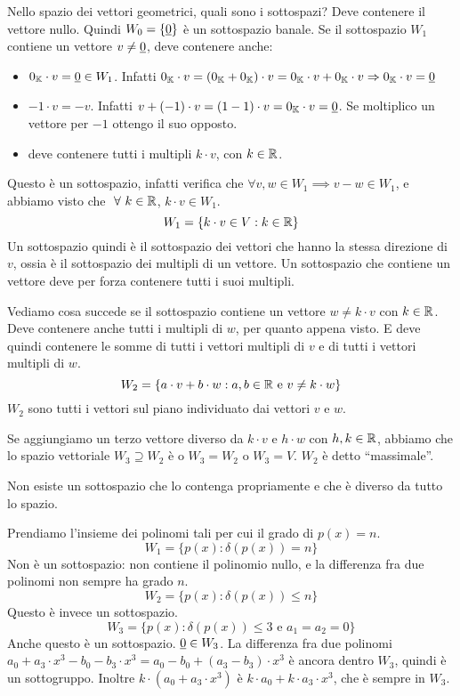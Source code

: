 Nello spazio dei vettori geometrici, quali sono i sottospazi? Deve contenere il vettore nullo. Quindi $W_0 = \{ \underline{0} \}$ \`e un sottospazio banale. Se il sottospazio $W_1$ contiene un vettore $v \neq \underline{0}$, deve contenere anche:
\begin{itemize}
    \item $0_{\mathbb{K}} \cdot v = \underline{0} \in W_1$. Infatti $0_{\mathbb{K}} \cdot v = (0_{\mathbb{K}} + 0_{\mathbb{K}}) \cdot v = 0_{\mathbb{K}} \cdot v + 0_{\mathbb{K}} \cdot v \Rightarrow 0_{\mathbb{K}} \cdot v = \underline{0}$
    \item $-1 \cdot v = -v$. Infatti $v + (-1) \cdot v = (1 - 1) \cdot v = 0_{\mathbb{K}} \cdot v = \underline{0}$. Se moltiplico un vettore per $-1$ ottengo il suo opposto.
    \item deve contenere tutti i multipli $k \cdot v$, con $k \in \mathbb{R}$.
\end{itemize}
Questo \`e un sottospazio, infatti verifica che $\forall v, w \in W_1 \implies v - w \in W_1$, e abbiamo visto che $\forall k \in \reals$, $k \cdot v \in W_1$.
\[
W_1 = \{ k \cdot v \in V : k \in \mathbb{R} \}
\]
Un sottospazio quindi \`e il sottospazio dei vettori che hanno la stessa direzione di $v$, ossia \`e il sottospazio dei multipli di un vettore. Un sottospazio che contiene un vettore deve per forza contenere tutti i suoi multipli.

Vediamo cosa succede se il sottospazio contiene un vettore $w \neq k \cdot v$ con $k \in \mathbb{R}$. Deve contenere anche tutti i multipli di $w$, per quanto appena visto. E deve quindi contenere le somme di tutti i vettori multipli di $v$ e di tutti i vettori multipli di $w$.
\[
W_2 = \{ a \cdot v + b \cdot w : a, b \in \mathbb{R} \text{ e } v \neq k \cdot w \}
\]
$W_2$ sono tutti i vettori sul piano individuato dai vettori $v$ e $w$.


Se aggiungiamo un terzo vettore diverso da $k \cdot v$ e $h \cdot w$ con $h, k \in \mathbb{R}$, abbiamo che lo spazio vettoriale $W_3 \supseteq W_2$ \`e o $W_3 = W_2$ o $W_3 = V$. $W_2$ \`e detto ``massimale''.

Non esiste un sottospazio che lo contenga propriamente e che \`e diverso da tutto lo spazio.

Prendiamo l'insieme dei polinomi tali per cui il grado di $p(x) = n$.
\[
W_1 = \{ p(x) : \delta (p(x)) = n \}
\]
Non \`e un sottospazio: non contiene il polinomio nullo, e la differenza fra due polinomi non sempre ha grado $n$.
\[
W_2 = \{ p(x) : \delta (p(x)) \le n \}
\]
Questo \`e invece un sottospazio.
\[
W_3 = \{ p(x) : \delta (p(x)) \le 3 \text{ e } a_1 = a_2 = 0 \}
\]
Anche questo \`e un sottospazio. $\underline{0} \in W_3$. La differenza fra due polinomi $a_0 + a_3 \cdot x^3 - b_0 - b_3 \cdot x^3 = a_0 - b_0 + (a_3 - b_3) \cdot x^3$ \`e ancora dentro $W_3$, quindi \`e un sottogruppo. Inoltre $k \cdot (a_0 + a_3 \cdot x^3)$ \`e $k \cdot a_0 + k \cdot a_3 \cdot x^3$, che \`e sempre in $W_3$.

